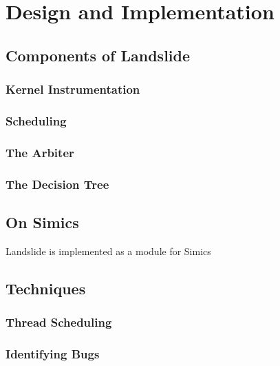 \section{Design and Implementation}
\subsection{Components of Landslide}

\subsubsection{Kernel Instrumentation}

\subsubsection{Scheduling}

\subsubsection{The Arbiter}

\subsubsection{The Decision Tree}

\subsection{On Simics}

Landslide is implemented as a module for Simics\cite{simics}

\subsection{Techniques}

\subsubsection{Thread Scheduling}

\subsubsection{Identifying Bugs}

